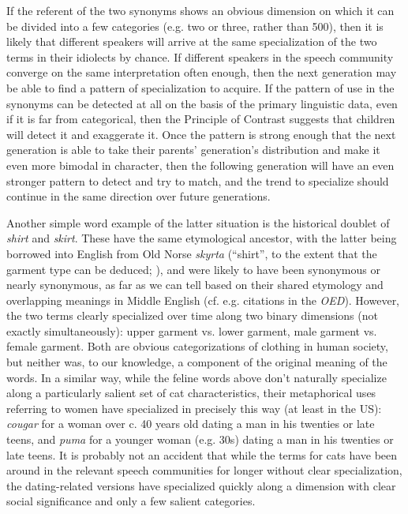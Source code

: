 If the referent of the two synonyms shows an obvious dimension on which it can be divided into a few categories (e.g. two or three, rather than 500), then it is likely that different speakers will arrive at the same specialization of the two terms in their idiolects by chance. If different speakers in the speech community converge on the same interpretation often enough, then the next generation may be able to find a pattern of specialization to acquire. If the pattern of use in the synonyms can be detected at all on the basis of the primary linguistic data, even if it is far from categorical, then the Principle of Contrast suggests that children will detect it and exaggerate it. Once the pattern is strong enough that the next generation is able to take their parents' generation's distribution and make it even more bimodal in character, then the following generation will have an even stronger pattern to detect and try to match, and the trend to specialize should continue in the same direction over future generations.

Another simple word example of the latter situation is the historical doublet of \textsl{shirt} and \textsl{skirt}. These have the same etymological ancestor, with the latter being borrowed into English from Old Norse \textsl{skyrta} (``shirt'', to the extent that the garment type can be deduced; \citealt{cleasbyvigfusson}), and were likely to have been synonymous or nearly synonymous, as far as we can tell based on their shared etymology and overlapping meanings in Middle English (cf. e.g. citations in the \textsl{OED}). However, the two terms clearly specialized over time along two binary dimensions (not exactly simultaneously): upper garment vs. lower garment, male garment vs. female garment. Both are obvious categorizations of clothing in human society, but neither was, to our knowledge, a component of the original meaning of the words. In a similar way, while the feline words above don't naturally specialize along a particularly salient set of cat characteristics, their metaphorical uses referring to women have specialized in precisely this way (at least in the US): \textsl{cougar} for a woman over c. 40 years old dating a man in his twenties or late teens, and \textsl{puma} for a younger woman (e.g. 30s) dating a man in his twenties or late teens. It is probably not an accident that while the terms for cats have been around in the relevant speech communities for longer without clear specialization, the dating-related versions have specialized quickly along a dimension with clear social significance and only a few salient categories.

